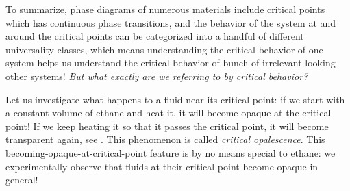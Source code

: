\documentclass[12pt]{article}
\numberwithin{equation}{section}
\begin{document}
To summarize, phase diagrams of numerous materials include critical points which has continuous phase transitions, and the behavior of the system at and around the critical points can be categorized into a handful of different universality classes, which means understanding the critical behavior of one system helps us understand the critical behavior of bunch of irrelevant-looking other systems! \emph{But what exactly are we referring to by critical behavior?}

Let us investigate what happens to a fluid near its critical point: if we start with a constant volume of ethane and heat it, it will become opaque at the critical point! If we keep heating it so that it passes the critical point, it will become transparent again, see \figref{\ref{fig: critical opalescense}}. This phenomenon is called \emph{critical opalescence}. This becoming-opaque-at-critical-point feature is by no means special to ethane: we experimentally observe that fluids at their critical point become opaque in general!
\end{document}
